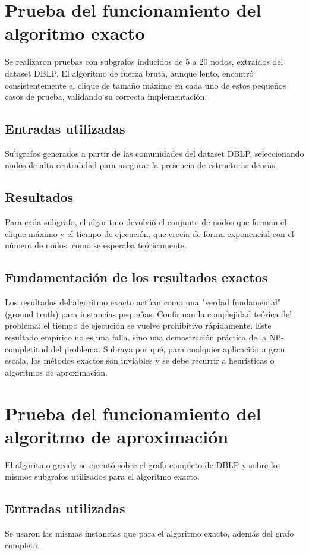 \documentclass[12pt,a4paper]{report}
\begin{document}
\section{Prueba del funcionamiento del algoritmo exacto}
Se realizaron pruebas con subgrafos inducidos de 5 a 20 nodos, extraídos del dataset DBLP. El algoritmo de fuerza bruta, aunque lento, encontró consistentemente el clique de tamaño máximo en cada uno de estos pequeños casos de prueba, validando su correcta implementación.

\subsection{Entradas utilizadas}
Subgrafos generados a partir de las comunidades del dataset DBLP, seleccionando nodos de alta centralidad para asegurar la presencia de estructuras densas.

\subsection{Resultados}
Para cada subgrafo, el algoritmo devolvió el conjunto de nodos que forman el clique máximo y el tiempo de ejecución, que crecía de forma exponencial con el número de nodos, como se esperaba teóricamente.

\subsection{Fundamentación de los resultados exactos}
Los resultados del algoritmo exacto actúan como una "verdad fundamental" (ground truth) para instancias pequeñas. Confirman la complejidad teórica del problema: el tiempo de ejecución se vuelve prohibitivo rápidamente. Este resultado empírico no es una falla, sino una demostración práctica de la NP-completitud del problema. Subraya por qué, para cualquier aplicación a gran escala, los métodos exactos son inviables y se debe recurrir a heurísticas o algoritmos de aproximación.

\section{Prueba del funcionamiento del algoritmo de aproximación}
El algoritmo greedy se ejecutó sobre el grafo completo de DBLP y sobre los mismos subgrafos utilizados para el algoritmo exacto.

\subsection{Entradas utilizadas}
Se usaron las mismas instancias que para el algoritmo exacto, además del grafo completo.
\end{document}
